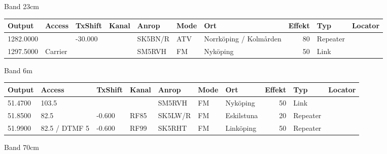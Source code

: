 \large{Band 23cm}
\begin{longtable}{lllllllrlr}
Output & Access & TxShift & Kanal & Anrop & Mode & Ort & Effekt & Typ & Locator \\ \hline
1282.0000&&-30.000&&SK5BN/R&ATV&Norrköping / Kolmården&80&Repeater&\\
1297.5000&Carrier&&&SM5RVH&FM&Nyköping&50&Link&\\
\end{longtable}
\large{Band 6m}
\begin{longtable}{lllllllrlr}
Output & Access & TxShift & Kanal & Anrop & Mode & Ort & Effekt & Typ & Locator \\ \hline
51.4700&103.5&&&SM5RVH&FM&Nyköping&50&Link&\\
51.8500&82.5&-0.600&RF85&SK5LW/R&FM&Eskilstuna&20&Repeater&\\
51.9900&82.5 / DTMF 5&-0.600&RF99&SK5RHT&FM&Linköping&50&Repeater&\\
\end{longtable}
\large{Band 70cm}
